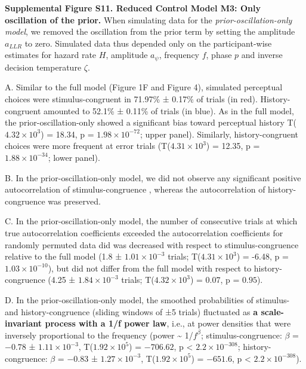 \documentclass[
]{article}
\begin{document}
\textbf{Supplemental Figure S11. Reduced Control Model M3: Only
oscillation of the prior.} When simulating data for the
\emph{prior-oscillation-only model}, we removed the oscillation from the
prior term by setting the amplitude \(a_{LLR}\) to zero. Simulated data
thus depended only on the participant-wise estimates for hazard rate
\(H\), amplitude \(a_{\psi}\), frequency \(f\), phase \(p\) and inverse
decision temperature \(\zeta\).

A. Similar to the full model (Figure 1F and Figure 4), simulated
perceptual choices were stimulus-congruent in 71.97\% ± 0.17\% of trials
(in red). History-congruent amounted to 52.1\% ± 0.11\% of trials (in
blue). As in the full model, the prior-oscillation-only showed a
significant bias toward perceptual history
T(\ensuremath{4.32\times 10^{3}}) = 18.34, p =
\(\ensuremath{1.98\times 10^{-72}}\); upper panel). Similarly,
history-congruent choices were more frequent at error trials
(T(\ensuremath{4.31\times 10^{3}}) = 12.35, p =
\(\ensuremath{1.88\times 10^{-34}}\); lower panel).

B. In the prior-oscillation-only model, we did not observe any
significant positive autocorrelation of stimulus-congruence , whereas
the autocorrelation of history-congruence was preserved.

C. In the prior-oscillation-only model, the number of consecutive trials
at which true autocorrelation coefficients exceeded the autocorrelation
coefficients for randomly permuted data did was decreased with respect
to stimulus-congruence relative to the full model (1.8 ±
\ensuremath{1.01\times 10^{-3}} trials;
T(\ensuremath{4.31\times 10^{3}}) = -6.48, p =
\(\ensuremath{1.03\times 10^{-10}}\)), but did not differ from the full
model with respect to history-congruence (4.25 ±
\ensuremath{1.84\times 10^{-3}} trials;
T(\ensuremath{4.32\times 10^{3}}) = 0.07, p = \(0.95\)).

D. In the prior-oscillation-only model, the smoothed probabilities of
stimulus- and history-congruence (sliding windows of ±5 trials)
fluctuated as \textbf{a scale-invariant process with a 1/f power law},
i.e., at power densities that were inversely proportional to the
frequency (power \textasciitilde{} 1/\(f^\beta\); stimulus-congruence:
\(\beta\) = \(-0.78\) ± \(\ensuremath{1.11\times 10^{-3}}\),
T(\(\ensuremath{1.92\times 10^{5}}\)) = \(-706.62\), p < \(\ensuremath{2.2\times 10^{-308}}\);
history-congruence: \(\beta\) = \(-0.83\) ±
\(\ensuremath{1.27\times 10^{-3}}\),
T(\(\ensuremath{1.92\times 10^{5}}\)) = \(-651.6\), p < \(\ensuremath{2.2\times 10^{-308}}\)).
\end{document}
